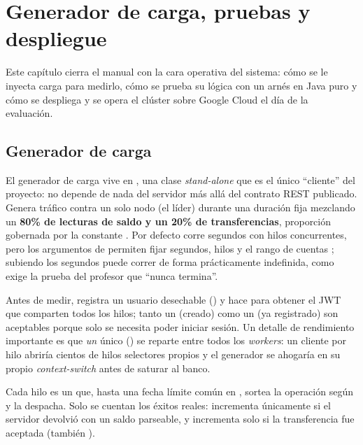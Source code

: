 \section{Generador de carga, pruebas y despliegue}

Este capítulo cierra el manual con la cara operativa del sistema: cómo se le
inyecta carga para medirlo, cómo se prueba su lógica con un arnés en Java puro y
cómo se despliega y se opera el clúster sobre Google Cloud el día de la
evaluación.

\subsection{Generador de carga}

El generador de carga vive en , una clase
\emph{stand-alone} que es el único ``cliente'' del proyecto: no depende de nada
del servidor más allá del contrato REST publicado. Genera tráfico contra un solo
nodo (el líder) durante una duración fija mezclando un \textbf{80\% de lecturas
de saldo y un 20\% de transferencias}, proporción gobernada por la constante
. Por defecto corre 
segundos con  hilos concurrentes, pero los
argumentos de  permiten fijar segundos, hilos y el rango de cuentas
; subiendo los segundos puede correr de forma
prácticamente indefinida, como exige la prueba del profesor que ``nunca
termina''.

Antes de medir,  registra un usuario desechable
() y hace  para obtener el JWT que comparten
todos los hilos; tanto un  (creado) como un  (ya
registrado) son aceptables porque solo se necesita poder iniciar sesión. Un
detalle de rendimiento importante es que \emph{un} único 
() se reparte entre todos los \emph{workers}: un cliente por
hilo abriría cientos de hilos selectores propios y el generador se ahogaría en su
propio \emph{context-switch} antes de saturar al banco.

Cada hilo es un  que, hasta una fecha límite común en
, sortea la operación según  y la
despacha. Solo se cuentan los éxitos reales:  incrementa
 únicamente si el servidor devolvió  con un saldo
parseable, y  incrementa  solo si la
transferencia fue aceptada (también ).

